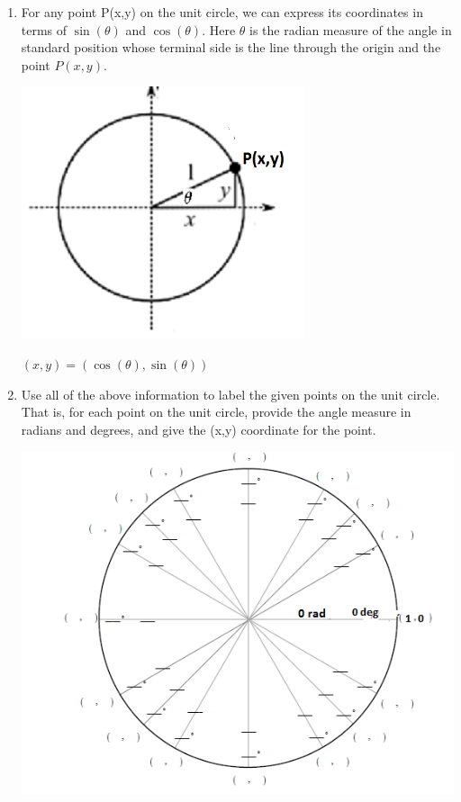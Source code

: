 \documentclass[nooutcomes]{ximera}
\begin{document}
\begin{problem}
\begin{enumerate}
	\item 
For any point P(x,y) on the unit circle, we can express its coordinates in terms of $\sin(\theta)$ and $\cos(\theta)$.
Here $\theta$ is the radian measure of the angle in standard position whose terminal side is the line through the origin and the point $P(x,y)$.
\begin{image}
		\includegraphics[scale=.8]{figure13.png}
		\end{image}
		\begin{freeResponse}
	$(x,y)=(\cos(\theta),\sin(\theta))$
	\end{freeResponse}

	\item  Use all of the above information to label the given points on the unit circle.  That is, for each point on the unit circle, provide the angle measure in radians and degrees, and give the (x,y) coordinate for the point.
		\begin{image}
		\includegraphics{figure6.png}
		\end{image}


\end{enumerate}
\end{problem}
\end{document}
